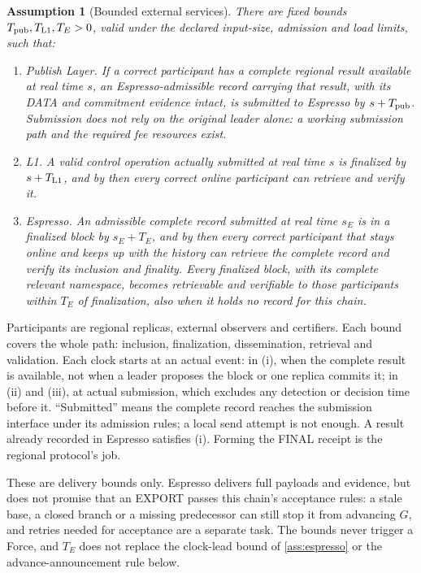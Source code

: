 \documentclass[11pt,a4paper]{article}
\newtheorem{assumption}[assumption]{Assumption}
\newcounter{protocol}
\begin{document}
\begin{assumption}[Bounded external services]
\label{ass:services}
There are fixed bounds $T_{\rm pub},T_{\rm L1},T_E>0$, valid under the
declared input-size, admission and load limits, such that:
\begin{enumerate}[label=(\roman*)]
\item \emph{Publish Layer.} If a correct participant has a complete
regional result available at real time $s$, an Espresso-admissible record
carrying that result, with its DATA and commitment evidence intact, is
submitted to Espresso by $s+T_{\rm pub}$. Submission does not rely on the
original leader alone: a working submission path and the required fee
resources exist.
\item \emph{L1.} A valid control operation actually submitted at real
time $s$ is finalized by $s+T_{\rm L1}$, and by then every correct online
participant can retrieve and verify it.
\item \emph{Espresso.} An admissible complete record submitted at real
time $s_E$ is in a finalized block by $s_E+T_E$, and by then every correct
participant that stays online and keeps up with the history can retrieve
the complete record and verify its inclusion and finality. Every finalized
block, with its complete relevant namespace, becomes retrievable and
verifiable to those participants within $T_E$ of finalization, also when
it holds no record for this chain.
\end{enumerate}
\end{assumption}
Participants are regional replicas, external observers and certifiers.
Each bound covers the whole path: inclusion, finalization, dissemination,
retrieval and validation. Each clock starts at an actual event: in (i),
when the complete result is available, not when a leader proposes the
block or one replica commits it; in (ii) and (iii), at actual submission,
which excludes any detection or decision time before it. ``Submitted''
means the complete record reaches the submission interface under its
admission rules; a local send attempt is not enough. A result already
recorded in Espresso satisfies (i). Forming the FINAL receipt is the
regional protocol's job.

These are delivery bounds only. Espresso delivers full payloads and
evidence, but does not promise that an EXPORT passes this chain's
acceptance rules: a stale base, a closed branch or a missing predecessor
can still stop it from advancing $G$, and retries needed for acceptance
are a separate task. The bounds never trigger a Force, and $T_E$ does not
replace the clock-lead bound of \cref{ass:espresso} or the
advance-announcement rule below.
\end{document}
